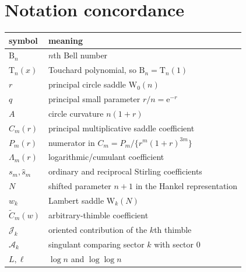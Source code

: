 \documentclass[11pt,a4paper]{article}
\theoremstyle{definition}
\newcommand{\Bell}{\mathrm B}
\newcommand{\Touch}{\mathrm T}
\newcommand{\W}{\mathrm W}
\newcommand{\ee}{\mathrm e}
\newcommand{\cA}{\mathcal A}
\newcommand{\cJ}{\mathcal J}
\begin{document}
\section{Notation concordance}

\begin{center}
\begin{tabularx}{\textwidth}{@{}>{\raggedright\arraybackslash}p{}X@{}}
\toprule
symbol & meaning\\
\midrule
$\Bell_n$ & $n$th Bell number\\
$\Touch_n(x)$ & Touchard polynomial, so $\Bell_n=\Touch_n(1)$\\
$r$ & principal circle saddle $\W_0(n)$\\
$q$ & principal small parameter $r/n=\ee^{-r}$\\
$A$ & circle curvature $n(1+r)$\\
$C_m(r)$ & principal multiplicative saddle coefficient\\
$P_m(r)$ & numerator in $C_m=P_m/\{r^m(1+r)^{3m}\}$\\
$\Lambda_m(r)$ & logarithmic/cumulant coefficient\\
$s_m,\widehat s_m$ & ordinary and reciprocal Stirling coefficients\\
$N$ & shifted parameter $n+1$ in the Hankel representation\\
$w_k$ & Lambert saddle $\W_k(N)$\\
$\widetilde C_m(w)$ & arbitrary-thimble coefficient\\
$\cJ_k$ & oriented contribution of the $k$th thimble\\
$\cA_k$ & singulant comparing sector $k$ with sector $0$\\
$L,\ell$ & $\log n$ and $\log\log n$\\
\bottomrule
\end{tabularx}
\end{center}
\end{document}
